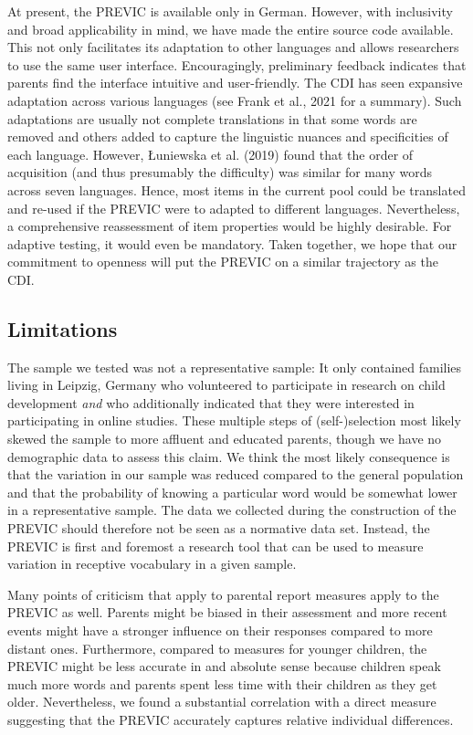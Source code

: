 \documentclass[
  man,floatsintext]{apa6}
\begin{document}
At present, the PREVIC is available only in German. However, with inclusivity and broad applicability in mind, we have made the entire source code available. This not only facilitates its adaptation to other languages and allows researchers to use the same user interface. Encouragingly, preliminary feedback indicates that parents find the interface intuitive and user-friendly. The CDI has seen expansive adaptation across various languages (see Frank et al., 2021 for a summary). Such adaptations are usually not complete translations in that some words are removed and others added to capture the linguistic nuances and specificities of each language. However, Łuniewska et al. (2019) found that the order of acquisition (and thus presumably the difficulty) was similar for many words across seven languages. Hence, most items in the current pool could be translated and re-used if the PREVIC were to adapted to different languages. Nevertheless, a comprehensive reassessment of item properties would be highly desirable. For adaptive testing, it would even be mandatory. Taken together, we hope that our commitment to openness will put the PREVIC on a similar trajectory as the CDI.

\hypertarget{limitations}{%
\subsection{Limitations}\label{limitations}}

The sample we tested was not a representative sample: It only contained families living in Leipzig, Germany who volunteered to participate in research on child development \emph{and} who additionally indicated that they were interested in participating in online studies. These multiple steps of (self-)selection most likely skewed the sample to more affluent and educated parents, though we have no demographic data to assess this claim. We think the most likely consequence is that the variation in our sample was reduced compared to the general population and that the probability of knowing a particular word would be somewhat lower in a representative sample. The data we collected during the construction of the PREVIC should therefore not be seen as a normative data set. Instead, the PREVIC is first and foremost a research tool that can be used to measure variation in receptive vocabulary in a given sample.

Many points of criticism that apply to parental report measures apply to the PREVIC as well. Parents might be biased in their assessment and more recent events might have a stronger influence on their responses compared to more distant ones. Furthermore, compared to measures for younger children, the PREVIC might be less accurate in and absolute sense because children speak much more words and parents spent less time with their children as they get older. Nevertheless, we found a substantial correlation with a direct measure suggesting that the PREVIC accurately captures relative individual differences.
\end{document}
